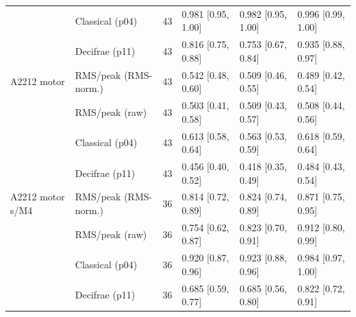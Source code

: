\begin{table}[t]
\begin{tabular}{llrlll}
 & Classical (p04) & 43 & 0.981 [0.95, 1.00] & 0.982 [0.95, 1.00] & 0.996 [0.99, 1.00] \\
 & Decifrae (p11) & 43 & 0.816 [0.75, 0.88] & 0.753 [0.67, 0.84] & 0.935 [0.88, 0.97] \\
\midrule
A2212 motor & RMS/peak (RMS-norm.) & 43 & 0.542 [0.48, 0.60] & 0.509 [0.46, 0.55] & 0.489 [0.42, 0.54] \\
 & RMS/peak (raw) & 43 & 0.503 [0.41, 0.58] & 0.509 [0.43, 0.57] & 0.508 [0.44, 0.56] \\
 & Classical (p04) & 43 & 0.613 [0.58, 0.64] & 0.563 [0.53, 0.59] & 0.618 [0.59, 0.64] \\
 & Decifrae (p11) & 43 & 0.456 [0.40, 0.52] & 0.418 [0.35, 0.49] & 0.484 [0.43, 0.54] \\
\midrule
A2212 motor s/M4 & RMS/peak (RMS-norm.) & 36 & 0.814 [0.72, 0.89] & 0.824 [0.74, 0.89] & 0.871 [0.75, 0.95] \\
 & RMS/peak (raw) & 36 & 0.754 [0.62, 0.87] & 0.823 [0.70, 0.91] & 0.912 [0.80, 0.99] \\
 & Classical (p04) & 36 & 0.920 [0.87, 0.96] & 0.923 [0.88, 0.96] & 0.984 [0.97, 1.00] \\
 & Decifrae (p11) & 36 & 0.685 [0.59, 0.77] & 0.685 [0.56, 0.80] & 0.822 [0.72, 0.91] \\
\bottomrule
\end{tabular}
\end{table}
